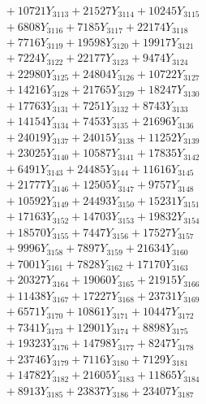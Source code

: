 \documentclass[a4paper,10pt]{article}
\begin{document}
{\begin{align}
&\;  + 10721 Y_{3113} + 21527 Y_{3114} + 10245 Y_{3115} \\[0.3ex]
&\;  + 6808 Y_{3116} + 7185 Y_{3117} + 22174 Y_{3118} \\[0.5ex]\allowbreak
&\;  + 7716 Y_{3119} + 19598 Y_{3120} + 19917 Y_{3121} \\[0.3ex]
&\;  + 7224 Y_{3122} + 22177 Y_{3123} + 9474 Y_{3124} \\[0.3ex]
&\;  + 22980 Y_{3125} + 24804 Y_{3126} + 10722 Y_{3127} \\[0.3ex]
&\;  + 14216 Y_{3128} + 21765 Y_{3129} + 18247 Y_{3130} \\[0.3ex]
&\;  + 17763 Y_{3131} + 7251 Y_{3132} + 8743 Y_{3133} \\[0.3ex]
&\;  + 14154 Y_{3134} + 7453 Y_{3135} + 21696 Y_{3136} \\[0.3ex]
&\;  + 24019 Y_{3137} + 24015 Y_{3138} + 11252 Y_{3139} \\[0.3ex]
&\;  + 23025 Y_{3140} + 10587 Y_{3141} + 17835 Y_{3142} \\[0.3ex]
&\;  + 6491 Y_{3143} + 24485 Y_{3144} + 11616 Y_{3145} \\[0.3ex]
&\;  + 21777 Y_{3146} + 12505 Y_{3147} + 9757 Y_{3148} \\[0.5ex]\allowbreak
&\;  + 10592 Y_{3149} + 24493 Y_{3150} + 15231 Y_{3151} \\[0.3ex]
&\;  + 17163 Y_{3152} + 14703 Y_{3153} + 19832 Y_{3154} \\[0.3ex]
&\;  + 18570 Y_{3155} + 7447 Y_{3156} + 17527 Y_{3157} \\[0.3ex]
&\;  + 9996 Y_{3158} + 7897 Y_{3159} + 21634 Y_{3160} \\[0.3ex]
&\;  + 7001 Y_{3161} + 7828 Y_{3162} + 17170 Y_{3163} \\[0.3ex]
&\;  + 20327 Y_{3164} + 19060 Y_{3165} + 21915 Y_{3166} \\[0.3ex]
&\;  + 11438 Y_{3167} + 17227 Y_{3168} + 23731 Y_{3169} \\[0.3ex]
&\;  + 6571 Y_{3170} + 10861 Y_{3171} + 10447 Y_{3172} \\[0.3ex]
&\;  + 7341 Y_{3173} + 12901 Y_{3174} + 8898 Y_{3175} \\[0.3ex]
&\;  + 19323 Y_{3176} + 14798 Y_{3177} + 8247 Y_{3178} \\[0.5ex]\allowbreak
&\;  + 23746 Y_{3179} + 7116 Y_{3180} + 7129 Y_{3181} \\[0.3ex]
&\;  + 14782 Y_{3182} + 21605 Y_{3183} + 11865 Y_{3184} \\[0.3ex]
&\;  + 8913 Y_{3185} + 23837 Y_{3186} + 23407 Y_{3187} \\[0.3ex]

\end{align}}
\end{document}
